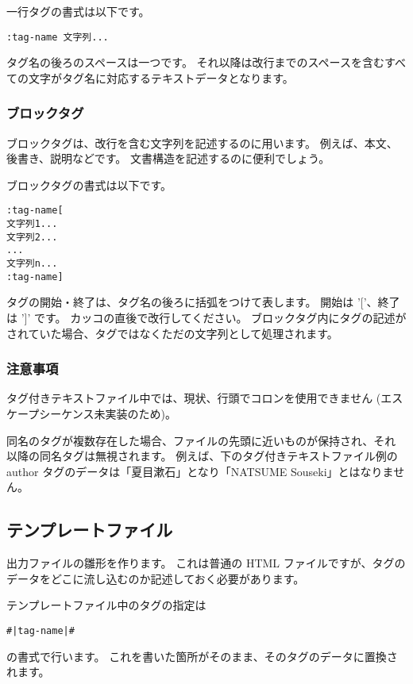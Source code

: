 \documentclass[a4j]{jsarticle}
\begin{document}
一行タグの書式は以下です。
\begin{lstlisting}[caption=一行タグの書式]
:tag-name 文字列...
\end{lstlisting}
タグ名の後ろのスペースは一つです。
それ以降は改行までのスペースを含むすべての文字がタグ名に対応するテキストデータとなります。


\subsubsection{ブロックタグ}
ブロックタグは、改行を含む文字列を記述するのに用います。
例えば、本文、後書き、説明などです。
文書構造を記述するのに便利でしょう。

ブロックタグの書式は以下です。
\begin{lstlisting}[caption=ブロックタグの書式]
:tag-name[
文字列1...
文字列2...
...
文字列n...
:tag-name]
\end{lstlisting}
タグの開始・終了は、タグ名の後ろに括弧をつけて表します。
開始は '['、終了は ']' です。
カッコの直後で改行してください。
ブロックタグ内にタグの記述がされていた場合、タグではなくただの文字列として処理されます。


\subsubsection{注意事項}
タグ付きテキストファイル中では、現状、行頭でコロンを使用できません 
(エスケープシーケンス未実装のため)。

同名のタグが複数存在した場合、ファイルの先頭に近いものが保持され、それ以降の同名タグは無視されます。
例えば、下のタグ付きテキストファイル例の author タグのデータは「夏目漱石」となり「NATSUME Souseki」とはなりません。





\subsection{テンプレートファイル}
出力ファイルの雛形を作ります。
これは普通の HTML ファイルですが、タグのデータをどこに流し込むのか記述しておく必要があります。

テンプレートファイル中のタグの指定は
\begin{lstlisting}[caption=タグ指定の書式]
#|tag-name|#
\end{lstlisting}
の書式で行います。
これを書いた箇所がそのまま、そのタグのデータに置換されます。
\end{document}
